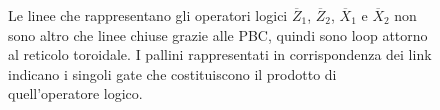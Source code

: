 \begin{figure}[!h]
	\centering	
	 \quad
	\caption{Le linee che rappresentano gli operatori logici $\overline{Z}_1$, $\overline{Z}_2$, $\overline{X}_1$ e $\overline{X}_2$ non sono altro che linee chiuse grazie alle PBC, quindi sono loop attorno al reticolo toroidale. I pallini rappresentati in corrispondenza dei link indicano i singoli gate che costituiscono il prodotto di quell'operatore logico.}
    \label{fig:logical_X_Z}
\end{figure}

